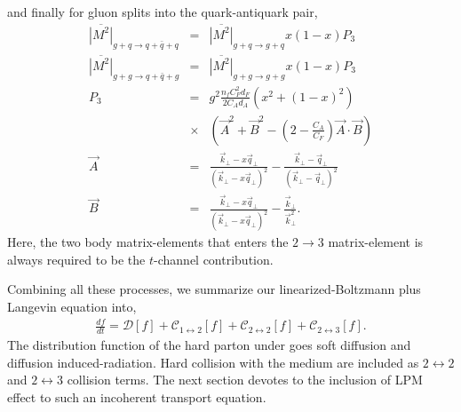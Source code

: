 \documentclass[aps, prc, reprint, amsmath, groupedaddress, nofootinbib]{revtex4-1}
\begin{document}
and finally for gluon splits into the quark-antiquark pair,
\begin{eqnarray}
\overline{|M^2|}_{g+q\rightarrow q+\bar{q}+q} &=& \overline{|M^2|}_{g+q\rightarrow g+q} x(1-x) P_3\\
\overline{|M^2|}_{g+g\rightarrow q+\bar{q}+g} &=& \overline{|M^2|}_{g+g\rightarrow g+g} x(1-x) P_3\\
P_3 &=& g^2 \frac{n_f C_F^2 d_F}{2C_A d_A}(x^2+(1-x)^2) \\\nonumber
&\times&\left(\vec{A}^2 + \vec{B}^2 - \left(2- \frac{C_A}{C_F}\right)\vec{A}\cdot\vec{B}\right)\\
\vec{A} &=& \frac{\vec{k}_\perp - x\vec{q}_\perp}{(\vec{k}_\perp - x\vec{q}_\perp)^2} -  \frac{\vec{k}_\perp - \vec{q}_\perp}{(\vec{k}_\perp - \vec{q}_\perp)^2} \\
\vec{B} &=& \frac{\vec{k}_\perp - x\vec{q}_\perp}{(\vec{k}_\perp - x\vec{q}_\perp)^2} -  \frac{\vec{k}_\perp}{\vec{k}_\perp^2}.
\end{eqnarray}
Here, the two body matrix-elements that enters the $2\rightarrow 3$ matrix-element is always required to be the $t$-channel contribution.

Combining all these processes, we summarize our linearized-Boltzmann plus Langevin equation into,
\begin{eqnarray}
\frac{df}{dt} = \mathcal{D}[f] + \mathcal{C}_{1\leftrightarrow 2}[f] + \mathcal{C}_{2\leftrightarrow 2}[f] + \mathcal{C}_{2\leftrightarrow 3}[f].
\end{eqnarray}
The distribution function of the hard parton under goes soft diffusion and diffusion induced-radiation. 
Hard collision with the medium are included as $2\leftrightarrow 2$ and $2\leftrightarrow 3$ collision terms.
The next section devotes to the inclusion of LPM effect to such an incoherent transport equation.
\end{document}
